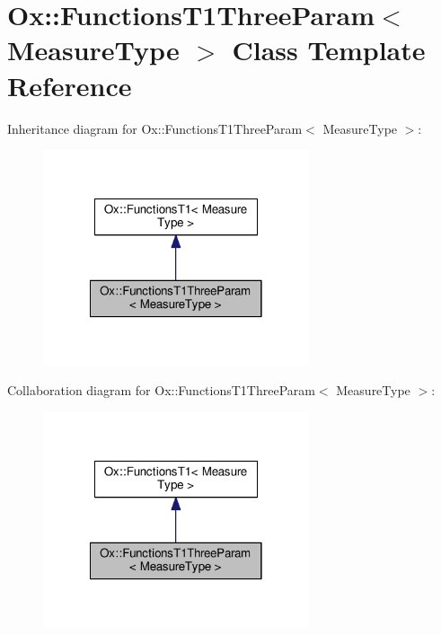 \hypertarget{class_ox_1_1_functions_t1_three_param}{\section{Ox\-:\-:Functions\-T1\-Three\-Param$<$ Measure\-Type $>$ Class Template Reference}
\label{class_ox_1_1_functions_t1_three_param}
}


Inheritance diagram for Ox\-:\-:Functions\-T1\-Three\-Param$<$ Measure\-Type $>$\-:
\nopagebreak
\begin{figure}[H]
\begin{center}
\leavevmode
\includegraphics[width=222pt]{class_ox_1_1_functions_t1_three_param__inherit__graph}
\end{center}
\end{figure}


Collaboration diagram for Ox\-:\-:Functions\-T1\-Three\-Param$<$ Measure\-Type $>$\-:
\nopagebreak
\begin{figure}[H]
\begin{center}
\leavevmode
\includegraphics[width=222pt]{class_ox_1_1_functions_t1_three_param__coll__graph}
\end{center}
\end{figure}
